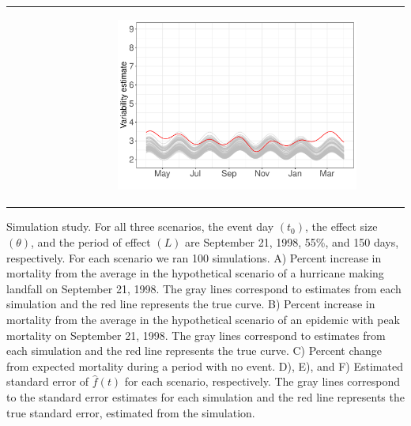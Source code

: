 \documentclass[11pt]{article}
\begin{document}
\begin{suppfigure}[ht]
\begin{tabular}{lll}
\begin{subfigure}[t]{0.30\linewidth}
	\end{subfigure}&
	\begin{subfigure}[t]{0.30\linewidth}
		\centering
		\includegraphics[width=1\linewidth]{figs/supp-figure-10f.pdf}
	\end{subfigure}\\
    \end{tabular}
    \caption{Simulation study. For all three scenarios, the event day $(t_0)$, the effect size $(\theta)$, and the period of effect $(L)$ are September 21, 1998, 55\%, and 150 days, respectively. For each scenario we ran 100 simulations. A) Percent increase in mortality from the average in the hypothetical scenario of a hurricane making landfall on September 21, 1998. The gray lines correspond to estimates from each simulation and the red line represents the true curve. B) Percent increase in mortality from the average in the hypothetical scenario of an epidemic with peak mortality on September 21, 1998. The gray lines correspond to estimates from each simulation and the red line represents the true curve. C) Percent change from expected mortality during a period with no event. D), E), and F) Estimated standard error of $\hat{f}(t)$ for each scenario, respectively. The gray lines correspond to the standard error estimates for each simulation and the red line represents the true standard error, estimated from the simulation.}
    \label{supp-fig:simulations}
\end{suppfigure}
\end{document}
